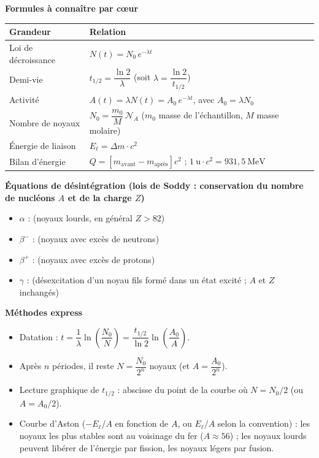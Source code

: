 \documentclass[11pt]{article}
\newcommand{\cle}[1]{{\popxbold\color{popdark}#1}}
\begin{document}
\begin{aretenir}
\textbf{Formules à connaître par cœur}
\begin{center}
\begin{tabularx}{\linewidth}{|l|X|}\hline
\rowcolor{popblueL} \textbf{Grandeur} & \textbf{Relation} \\ \hline
Loi de décroissance & $N(t) = N_0\, e^{-\lambda t}$ \\ \hline
Demi-vie & $t_{1/2} = \dfrac{\ln 2}{\lambda}$ \quad (soit $\lambda = \dfrac{\ln 2}{t_{1/2}}$) \\ \hline
Activité & $A(t) = \lambda N(t) = A_0\, e^{-\lambda t}$, avec $A_0 = \lambda N_0$ \\ \hline
Nombre de noyaux & $N_0 = \dfrac{m_0}{M}\, \mathcal{N}_A$ \quad ($m_0$ masse de l'échantillon, $M$ masse molaire) \\ \hline
Énergie de liaison & $E_\ell = \Delta m \cdot c^2$ \\ \hline
Bilan d'énergie & $Q = \left[m_{\text{avant}} - m_{\text{après}}\right] c^2$ ; \quad $1~\mathrm{u} \cdot c^2 = 931{,}5~\mathrm{MeV}$ \\ \hline
\end{tabularx}
\end{center}

\textbf{Équations de désintégration (lois de Soddy : conservation du nombre de nucléons $A$ et de la charge $Z$)}
\begin{itemize}
  \item $\alpha$ :  \quad (noyaux lourds, en général $Z > 82$)
  \item $\beta^-$ :  \quad (noyaux avec excès de neutrons)
  \item $\beta^+$ :  \quad (noyaux avec excès de protons)
  \item $\gamma$ :  \quad (désexcitation d'un noyau fils formé dans un état excité ; $A$ et $Z$ inchangés)
\end{itemize}

\textbf{Méthodes express}
\begin{itemize}
  \item \cle{Datation} : $t = \dfrac{1}{\lambda}\ln\!\left(\dfrac{N_0}{N}\right) = \dfrac{t_{1/2}}{\ln 2}\ln\!\left(\dfrac{A_0}{A}\right)$.
  \item Après $n$ périodes, il reste $N = \dfrac{N_0}{2^n}$ noyaux (et $A = \dfrac{A_0}{2^n}$).
  \item Lecture graphique de $t_{1/2}$ : abscisse du point de la courbe où $N = N_0/2$ (ou $A = A_0/2$).
  \item Courbe d'Aston ($-E_\ell/A$ en fonction de $A$, ou $E_\ell/A$ selon la convention) : les noyaux les plus stables sont au voisinage du fer ($A \approx 56$) ; les noyaux lourds peuvent libérer de l'énergie par fission, les noyaux légers par fusion.
\end{itemize}
\end{aretenir}
\end{document}
